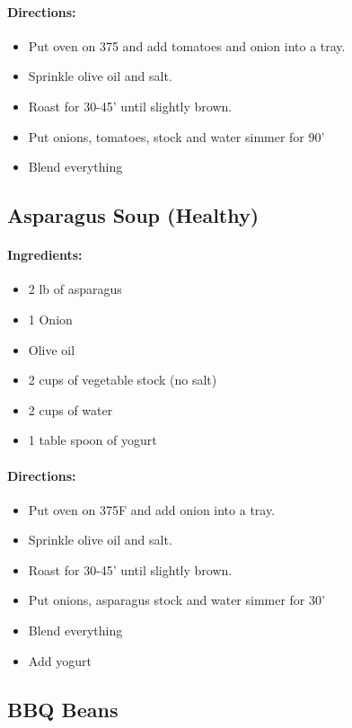 \documentclass{article}
\begin{document}
\paragraph{Directions:}
\begin{itemize}
	\item Put oven on 375 and add tomatoes and onion into a tray.
	\item Sprinkle olive oil and salt.
	\item Roast for 30-45' until slightly brown.
	\item Put onions, tomatoes, stock and water simmer for 90'
	\item Blend everything
\end{itemize}

\subsection{Asparagus Soup (Healthy)}

\paragraph{Ingredients:}
\begin{itemize}
	\item 2 lb of asparagus
	\item 1 Onion
	\item Olive oil
	\item 2 cups of vegetable stock (no salt)
	\item 2 cups of water
	\item 1 table spoon of yogurt
\end{itemize}

\paragraph{Directions:}
\begin{itemize}
	\item Put oven on 375F and add onion into a tray.
	\item Sprinkle olive oil and salt.
	\item Roast for 30-45' until slightly brown.
	\item Put onions, asparagus stock and water simmer for 30'
	\item Blend everything
	\item Add yogurt
\end{itemize}

\subsection{BBQ Beans}
\end{document}
